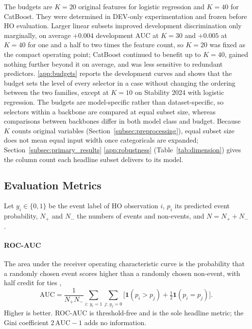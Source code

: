 \documentclass[final,5p,twocolumn]{elsarticle}
\newcommand{\Kfeat}{K}
\newcommand{\AUC}{\mathrm{AUC}}
\providecommand{\DIFaddtex}[1]{{\protect\color{blue} \sf #1}} %
\providecommand{\DIFdeltex}[1]{{\protect\color{red} \scriptsize #1}} %
\providecommand{\DIFaddbegin}{} %
\providecommand{\DIFaddend}{} %
\providecommand{\DIFdelbegin}{} %
\providecommand{\DIFdelend}{} %
\providecommand{\DIFadd}[1]{\texorpdfstring{\DIFaddtex{#1}}{#1}} %
\providecommand{\DIFdel}[1]{\texorpdfstring{\DIFdeltex{#1}}{}} %
\begin{document}
The budgets are $\Kfeat=20$ original features for logistic regression and $\Kfeat=40$ for CatBoost. They were determined in DEV-only experimentation and frozen before HO evaluation. Larger linear subsets improved development discrimination only marginally, on average $+0.004$ development AUC at $\Kfeat=30$ and $+0.005$ at $\Kfeat=40$ for one and a half to two times the feature count, so $\Kfeat=20$ was fixed as the compact operating point; CatBoost continued to benefit up to $\Kfeat=40$, gained nothing further beyond it on average, and was less sensitive to redundant predictors. \ref{app:budgets} reports the development curves and shows that the budget sets the level of every selector in a case without changing the ordering between the two families, except at $\Kfeat=10$ on Stability 2024 with logistic regression. The budgets are model-specific rather than dataset-specific, so selectors within a backbone are compared at equal subset size, whereas comparisons between backbones differ in both model class and budget. Because $\Kfeat$ counts original variables (Section~\ref{subsec:preprocessing}), equal subset size does not mean equal input width once categoricals are expanded; \DIFdelbegin \DIFdel{Section~\ref{subsec:primary_results} }\DIFdelend \DIFaddbegin \DIFadd{\ref{app:robustness} (Table~\ref{tab:dimension}) }\DIFaddend gives the column count each headline subset delivers to its model.

\subsection{Evaluation Metrics}
\label{subsec:metrics}

Let $y_i\in\{0,1\}$ be the event label of HO observation $i$, $p_i$ its predicted event probability, $N_+$ and $N_-$ the numbers of events and non-events, and $N=N_++N_-$.

\paragraph{ROC-AUC}
The area under the receiver operating characteristic curve is the probability that a randomly chosen event scores higher than a randomly chosen non-event, with half credit for ties \cite{hanley1982},
\begin{equation}
    \AUC=\frac{1}{N_+N_-}\sum_{i:\,y_i=1}\sum_{j:\,y_j=0}\big[\mathbf{1}(p_i>p_j)+\tfrac12\mathbf{1}(p_i=p_j)\big].
    \label{eq:roc_auc}
\end{equation}
Higher is better. ROC-AUC is threshold-free and is the sole headline metric; the Gini coefficient $2\,\AUC-1$ adds no information.
\end{document}
